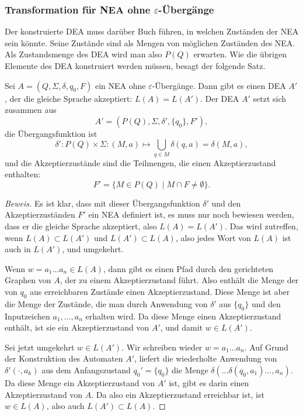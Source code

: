 \subsubsection{Transformation für NEA ohne $\varepsilon$-Übergänge}
Der konstruierte DEA muss darüber Buch führen, in welchen Zuständen
der NEA sein könnte.
Seine Zustände sind als Mengen von möglichen Zuständen des NEA.
Als Zustandsmenge des DEA wird man also $P(Q)$ 
erwarten.
Wie die übrigen Elemente des DEA konstruiert werden müssen,
besagt der folgende Satz.

\begin{satz}
\label{satz_neadea_eps}
Sei $A=(Q,\Sigma,\delta,q_0,F)$ ein NEA ohne $\varepsilon$-Übergänge.
Dann gibt es einen DEA $A'$, der die gleiche Sprache akzeptiert: $L(A)=L(A')$.
Der DEA $A'$ setzt sich zusammen aus
\[
A'=
(P(Q), \Sigma, \delta', \{q_0\}, F'),
\]
die Übergangsfunktion ist
\[
\delta'\colon P(Q)\times \Sigma: (M, a)\mapsto \bigcup_{q\in M} \delta(q,a)
=\delta(M,a),
\]
und die Akzeptierzustände sind die Teilmengen, die einen Akzeptierzustand
enthalten:
\[
F'=\{M\in P(Q)\;|\;M\cap F\ne \emptyset\}.
\]
\end{satz}
\begin{proof}[Beweis]
Es ist klar, dass mit dieser Übergangsfunktion $\delta'$ und den
Akzeptierzuständen $F'$ ein NEA definiert ist, es muss nur noch
bewiesen werden, dass er die gleiche Sprache akzeptiert, also
$L(A)=L(A')$.
Das wird zutreffen, wenn $L(A)\subset L(A')$ und
$L(A')\subset L(A)$, also jedes Wort von $L(A)$ ist auch in $L(A')$,
und umgekehrt.

Wenn $w=a_1\dots a_n\in L(A)$, dann gibt es einen Pfad durch den gerichteten
Graphen von $A$, der zu einem Akzeptierzustand führt.
Also enthält
die Menge der von $q_0$ aus erreichbaren Zustände einen Akzeptierzustand.
Diese Menge ist aber die Menge der Zustände, die man durch Anwendung
von $\delta'$ aus $\{q_0\}$ und den Inputzeichen $a_1,\dots,a_n$ erhalten
wird.
Da diese Menge einen Akzeptierzustand enthält, ist sie ein
Akzeptierzustand von $A'$, und damit $w\in L(A')$.

Sei jetzt umgekehrt $w\in L(A')$.
Wir schreiben wieder $w=a_1\dots a_n$.
Auf Grund der Konstruktion des Automaten $A'$, liefert die wiederholte
Anwendung von $\delta'(\cdot, a_k)$ aus dem Anfangszustand $q_0'=\{q_0\}$
die Menge $\delta(\dots\delta(q_0, a_1)\dots ,a_n)$.
Da diese Menge ein
Akzeptierzustand von $A'$ ist, gibt es darin einen Akzeptierzustand
von $A$.
Da also ein Akzeptierzustand erreichbar ist, ist $w\in L(A)$,
also auch $L(A')\subset L(A)$.
\end{proof}

